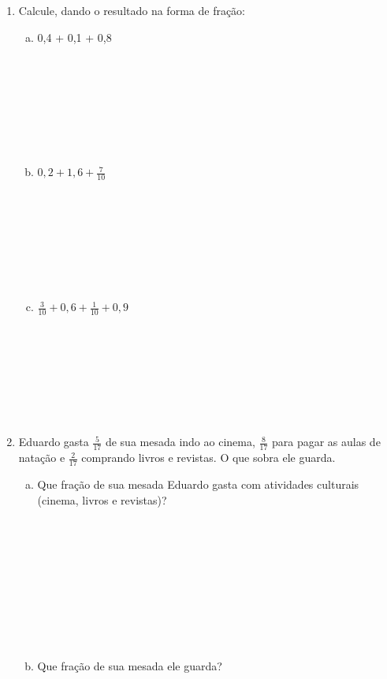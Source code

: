 \documentclass[a4paper,14pt]{article}
\begin{document}
\begin{multicols}{2}
\begin{enumerate}
\begin{enumerate}[a)]
			\end{enumerate}
			\item Calcule, dando o resultado na forma de fração:
			\begin{enumerate}[a)]
				\item 0,4 + 0,1 + 0,8 \\\\\\\\\\\\\\\\
				\item $0,2 + 1,6 + \frac{7}{10}$ \\\\\\\\\\\\\\\\
				\item $\frac{3}{10} + 0,6 + \frac{1}{10} + 0,9$ \\\\\\\\\\\\\\\\
			\end{enumerate}
			\item Eduardo gasta $\frac{5}{17}$ de sua mesada indo ao cinema, $\frac{8}{17}$ para pagar as aulas de natação e $\frac{2}{17}$ comprando livros e revistas. O que sobra ele guarda.
			\begin{enumerate}[a)]
				\item Que fração de sua mesada Eduardo gasta com atividades culturais (cinema, livros e revistas)? \\\\\\\\\\\\\\\\\\\\
				\item Que fração de sua mesada ele guarda? \\\\\\\\\\\\\\

\end{enumerate}
\end{enumerate}
\end{multicols}
\end{document}

